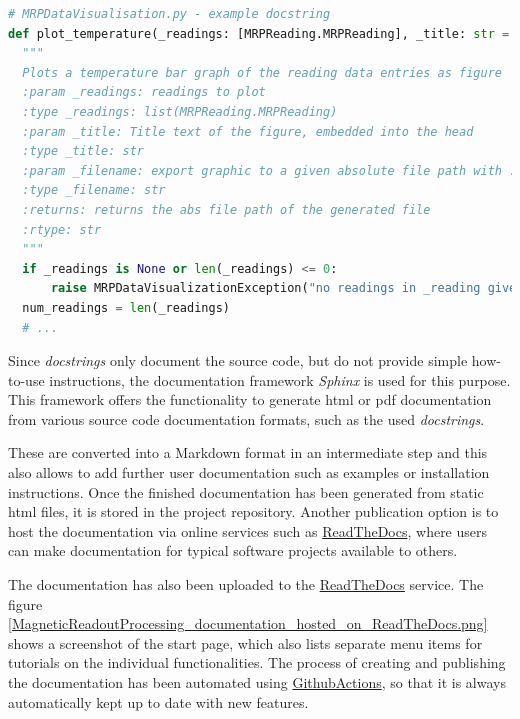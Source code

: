 \newpage

\begin{lstlisting}[language=Python, caption={Documentation using Python docstring example}, label=lst:pydocstring]
# MRPDataVisualisation.py - example docstring
def plot_temperature(_readings: [MRPReading.MRPReading], _title: str = '', _filename: str = None, _unit: str = "degree C") -> str:
  """
  Plots a temperature bar graph of the reading data entries as figure
  :param _readings: readings to plot
  :type _readings: list(MRPReading.MRPReading)
  :param _title: Title text of the figure, embedded into the head
  :type _title: str
  :param _filename: export graphic to a given absolute file path with .png
  :type _filename: str
  :returns: returns the abs file path of the generated file
  :rtype: str
  """
  if _readings is None or len(_readings) <= 0:
      raise MRPDataVisualizationException("no readings in _reading given")
  num_readings = len(_readings)
  # ...
\end{lstlisting}

Since \emph{docstrings} only document the source code, but do not
provide simple how-to-use instructions, the documentation framework
\emph{Sphinx}  is used for this purpose. This framework
offers the functionality to generate \gls{html} or \gls{pdf}
documentation from various source code documentation formats, such as
the used \emph{docstrings}.

These are converted into a Markdown format in an intermediate step and
this also allows to add further user documentation such as examples or
installation instructions. Once the finished documentation has been
generated from static \gls{html} files, it is stored in the project
repository. Another publication option is to host the documentation via
online services such as \href{https://readthedocs.com}{ReadTheDocs},
where users can make documentation for typical software projects
available to others.

The documentation has also been uploaded to the
\href{https://magneticreadoutprocessing.readthedocs.io/}{ReadTheDocs}
service. The figure
\ref{MagneticReadoutProcessing_documentation_hosted_on_ReadTheDocs.png}
shows a screenshot of the start page, which also lists separate menu
items for tutorials on the individual functionalities. The process of
creating and publishing the documentation has been automated using
\href{https://github.com/features/actions}{GithubActions}, so that it is
always automatically kept up to date with new features.


